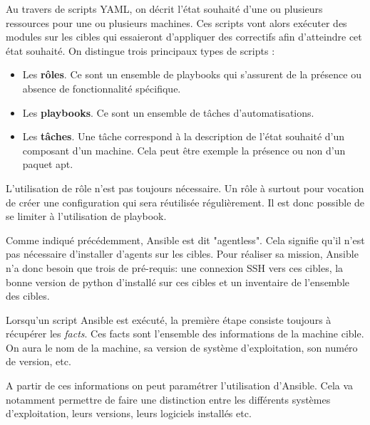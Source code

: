 \documentclass[12pt]{article}
\begin{document}
Au travers de scripts YAML, on décrit l'état souhaité d'une ou plusieurs ressources pour une ou plusieurs machines. 
Ces scripts vont alors exécuter des modules sur les cibles qui essaieront d'appliquer des correctifs afin d'atteindre cet état souhaité. 
On distingue trois principaux types de scripts :
\begin{itemize}
    \item Les \textbf{rôles}. Ce sont un ensemble de playbooks qui s'assurent de la présence ou absence de fonctionnalité spécifique.
    \item Les \textbf{playbooks}. Ce sont un ensemble de tâches d'automatisations.
    \item Les \textbf{tâches}. Une tâche correspond à la description de l'état souhaité d'un composant d'un machine. 
    Cela peut être exemple la présence ou non d'un paquet apt.
\end{itemize}

L'utilisation de rôle n'est pas toujours nécessaire. 
Un rôle à surtout pour vocation de créer une configuration qui sera réutilisée régulièrement. 
Il est donc possible de se limiter à l'utilisation de playbook.

Comme indiqué précédemment, \gls{Ansible} est dit "agentless". 
Cela signifie qu'il n'est pas nécessaire d'installer d'agents sur les cibles. 
Pour réaliser sa mission, \gls{Ansible} n'a donc besoin que trois de pré-requis:  une connexion SSH vers ces cibles, la bonne version de python d'installé sur ces cibles et un inventaire de l'ensemble des cibles.

Lorsqu'un script \gls{Ansible} est exécuté, la première étape consiste toujours à récupérer les \textit{facts}. 
Ces facts sont l'ensemble des informations de la machine cible. 
On aura le nom de la machine, sa version de système d'exploitation, son numéro de version, etc.

A partir de ces informations on peut paramétrer l'utilisation d'\gls{Ansible}. 
Cela va notamment permettre de faire une distinction entre les différents systèmes d'exploitation, leurs versions, leurs logiciels installés etc.
\end{document}

